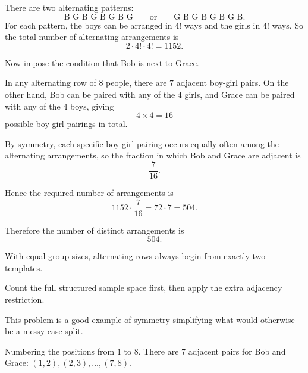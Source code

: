 \begin{solution}
There are two alternating patterns:
\[
\text{B G B G B G B G}
\qquad \text{or} \qquad
\text{G B G B G B G B}.
\]
For each pattern, the boys can be arranged in $4!$ ways and the girls in $4!$ ways. So the total number of alternating arrangements is
\[
2\cdot 4!\cdot 4!=1152.
\]

Now impose the condition that Bob is next to Grace.

In any alternating row of $8$ people, there are $7$ adjacent boy-girl pairs. On the other hand, Bob can be paired with any of the $4$ girls, and Grace can be paired with any of the $4$ boys, giving
\[
4\times 4=16
\]
possible boy-girl pairings in total.

By symmetry, each specific boy-girl pairing occurs equally often among the alternating arrangements, so the fraction in which Bob and Grace are adjacent is
\[
\frac{7}{16}.
\]

Hence the required number of arrangements is
\[
1152\cdot \frac{7}{16}=72\cdot 7=504.
\]

Therefore the number of distinct arrangements is
\[
\boxed{504}.
\]
\end{solution}

\begin{takeaways}
\item With equal group sizes, alternating rows always begin from exactly two templates.
\item Count the full structured sample space first, then apply the extra adjacency restriction.
\item This problem is a good example of symmetry simplifying what would otherwise be a messy case split.
\item Numbering the positions from $1$ to $8$. There are $7$ adjacent pairs for Bob and Grace: $(1,2),(2,3),\dots,(7,8)$. 
\end{takeaways}

